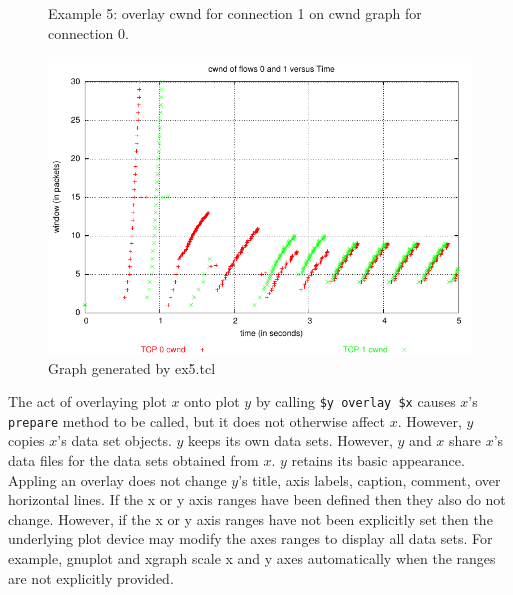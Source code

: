\documentclass[11pt]{article}
\begin{document}
\begin{figure}[ht]
\begin{center}
\end{center}
\caption{Example 5: overlay cwnd for connection 1 on cwnd graph for connection 0.}\label{ExOverlayFigure}
\end{figure}

\begin{figure}[!ht]
\centerline{\includegraphics[width=4.5in]{tcp-cwnd-vs-time}}
\caption{Graph generated by ex5.tcl}\label{ExOverlayPlotFigure}
\end{figure}

The act of overlaying plot $x$ onto plot $y$ by calling
\verb|$y overlay $x| causes $x$'s \verb|prepare| method to be called,
but it does not otherwise affect $x$.  However, $y$ copies $x$'s data
set objects.  $y$ keeps its own data sets.  However, $y$ and $x$ share
$x$'s data files for the data sets obtained from $x$.  $y$ retains its
basic appearance.  Appling an overlay does not change $y$'s title,
axis labels, caption, comment, over horizontal lines.  If the x or y
axis ranges have been defined then they also do not change.  However,
if the x or y axis ranges have not been explicitly set then the
underlying plot device may modify the axes ranges to display all data
sets.  For example, gnuplot and xgraph scale x and y axes automatically
when the ranges are not explicitly provided.
\end{document}
